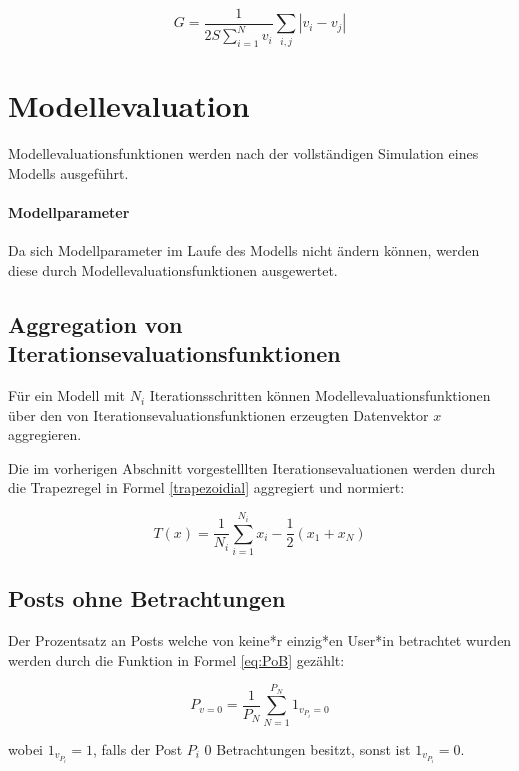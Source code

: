 \begin{equation}
G = \frac{1}{2S\sum_{i = 1}^{N}v_{i}}\sum_{i,j}|v_{i} - v_{j} |
\end{equation}


\section{Modellevaluation}

Modellevaluationsfunktionen werden nach der vollständigen Simulation eines Modells ausgeführt.

\paragraph{Modellparameter} 

Da sich Modellparameter im Laufe des Modells nicht ändern können, werden diese durch Modellevaluationsfunktionen ausgewertet.

\subsection{Aggregation von Iterationsevaluationsfunktionen}

Für ein Modell mit $N_i$ Iterationsschritten können 
Modellevaluationsfunktionen über den von Iterationsevaluationsfunktionen erzeugten Datenvektor $x$ aggregieren. 

Die im vorherigen Abschnitt vorgestelllten Iterationsevaluationen werden durch die Trapezregel in Formel \ref{trapezoidial} aggregiert und normiert:

\begin{equation}
\label{trapezoidial}
T(x) = \frac{1}{N_i}\sum_{i = 1}^{N_i}x_i - \frac{1}{2}(x_1 + x_N)
\end{equation}

\subsection{Posts ohne Betrachtungen}

Der Prozentsatz an Posts welche von keine*r einzig*en User*in betrachtet wurden werden durch die Funktion in Formel \ref{eq:PoB} gezählt:

\begin{equation}
\label{eq:PoB}
P_{v = 0} = \frac{1}{P_N}\sum_{N = 1}^{P_N} 1_{v_{P_i} = 0}
\end{equation}

wobei $1_{v_{P_i}} = 1$, falls der Post $P_i$ $0$ Betrachtungen besitzt, sonst ist $1_{v_{P_i}} = 0$.

 











